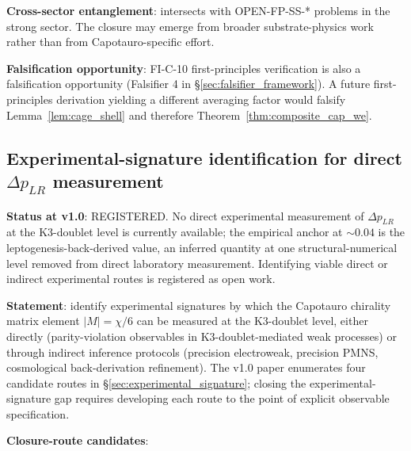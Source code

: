 \documentclass[11pt,letterpaper]{article}
\newcommand{\DeltapLR}{\Delta p_{LR}}
\begin{document}
\textbf{Cross-sector entanglement}: intersects with OPEN-FP-SS-* problems in the strong sector. The closure may emerge from broader substrate-physics work rather than from Capotauro-specific effort.

\textbf{Falsification opportunity}: FI-C-10 first-principles verification is also a falsification opportunity (Falsifier 4 in \S\ref{sec:falsifier_framework}). A future first-principles derivation yielding a different averaging factor would falsify Lemma~\ref{lem:cage_shell} and therefore Theorem~\ref{thm:composite_cap_we}.

\subsection{Experimental-signature identification for direct $\DeltapLR$ measurement}\label{sec:open_experimental_route}

\textbf{Status at v1.0}: REGISTERED. No direct experimental measurement of $\DeltapLR$ at the K3-doublet level is currently available; the empirical anchor at $\sim 0.04$ is the leptogenesis-back-derived value, an inferred quantity at one structural-numerical level removed from direct laboratory measurement. Identifying viable direct or indirect experimental routes is registered as open work.

\textbf{Statement}: identify experimental signatures by which the Capotauro chirality matrix element $|M| = \chi/6$ can be measured at the K3-doublet level, either directly (parity-violation observables in K3-doublet-mediated weak processes) or through indirect inference protocols (precision electroweak, precision PMNS, cosmological back-derivation refinement). The v1.0 paper enumerates four candidate routes in \S\ref{sec:experimental_signature}; closing the experimental-signature gap requires developing each route to the point of explicit observable specification.

\textbf{Closure-route candidates}:
\end{document}
